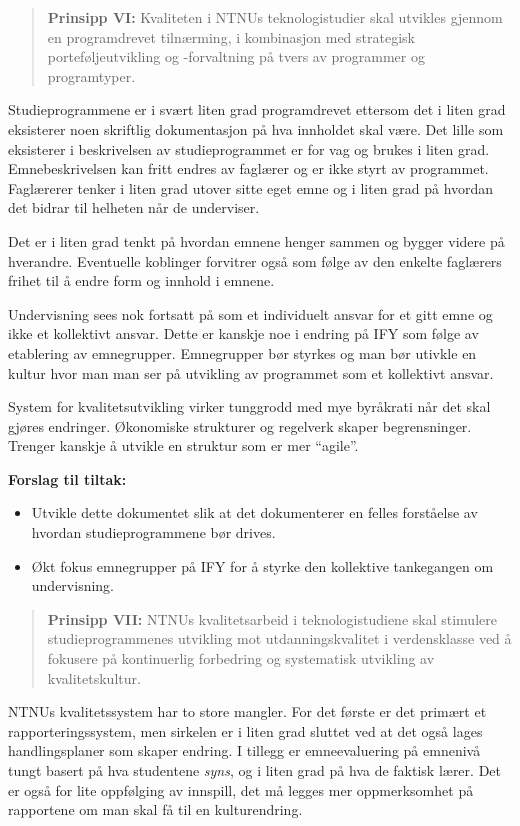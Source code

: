 \begin{quote}
	\textbf{Prinsipp VI:} Kvaliteten i NTNUs teknologistudier skal utvikles gjennom en programdrevet tilnærming, i kombinasjon med strategisk porteføljeutvikling og -forvaltning på tvers av programmer og programtyper.
\end{quote}

Studieprogrammene er i svært liten grad programdrevet ettersom det i liten grad eksisterer noen skriftlig dokumentasjon på hva innholdet skal være. Det lille som eksisterer i beskrivelsen av studieprogrammet er for vag og brukes i liten grad. Emnebeskrivelsen kan fritt endres av faglærer og er ikke styrt av programmet. Faglærerer tenker i liten grad utover sitte eget emne og i liten grad på hvordan det bidrar til helheten når de underviser.

Det er i liten grad tenkt på hvordan emnene henger sammen og bygger videre på hverandre. Eventuelle koblinger forvitrer også som følge av den enkelte faglærers frihet til å endre form og innhold i emnene.

Undervisning sees nok fortsatt på som et individuelt ansvar for et gitt emne og ikke et kollektivt ansvar. Dette er kanskje noe i endring på IFY som følge av etablering av emnegrupper. Emnegrupper bør styrkes og man bør utivkle en kultur hvor man man ser på utvikling av programmet som et kollektivt ansvar.

System for kvalitetsutvikling virker tunggrodd med mye byråkrati når det skal gjøres endringer. Økonomiske strukturer og regelverk skaper begrensninger. Trenger kanskje å utvikle en struktur som er mer \enquote{agile}.

\textbf{Forslag til tiltak:}

\begin{itemize}
	\item Utvikle dette dokumentet slik at det dokumenterer en felles forståelse av hvordan studieprogrammene bør drives.
	\item Økt fokus emnegrupper på IFY for å styrke den kollektive tankegangen om undervisning.
\end{itemize}

\begin{quote}
	\textbf{Prinsipp VII:} NTNUs kvalitetsarbeid i teknologistudiene skal stimulere studieprogrammenes utvikling mot utdanningskvalitet i verdensklasse ved å fokusere på kontinuerlig forbedring og systematisk utvikling av kvalitetskultur.
\end{quote}

NTNUs kvalitetssystem har to store mangler. For det første er det primært et rapporteringssystem, men sirkelen er i liten grad sluttet ved at det også lages handlingsplaner som skaper endring. I tillegg er emneevaluering på emnenivå tungt basert på hva studentene \emph{syns}, og i liten grad på hva de faktisk lærer. Det er også for lite oppfølging av innspill, det må legges mer oppmerksomhet på rapportene om man skal få til en kulturendring.

